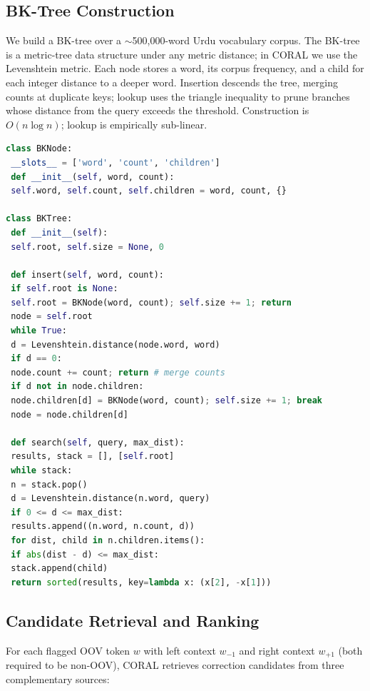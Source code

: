 \subsection{BK-Tree Construction}
\label{ssec:bk-construction}

We build a BK-tree over a $\sim$500{,}000-word Urdu vocabulary corpus. The BK-tree is a metric-tree data structure under any metric distance; in CORAL we use the Levenshtein metric. Each node stores a word, its corpus frequency, and a child for each integer distance to a deeper word. Insertion descends the tree, merging counts at duplicate keys; lookup uses the triangle inequality to prune branches whose distance from the query exceeds the threshold. Construction is $O(n \log n)$; lookup is empirically sub-linear.

\begin{lstlisting}[language=Python,caption={BK-tree (excerpt from \texttt{bktree.py}).},label={lst:bktree}]
class BKNode:
 __slots__ = ['word', 'count', 'children']
 def __init__(self, word, count):
 self.word, self.count, self.children = word, count, {}

class BKTree:
 def __init__(self):
 self.root, self.size = None, 0

 def insert(self, word, count):
 if self.root is None:
 self.root = BKNode(word, count); self.size += 1; return
 node = self.root
 while True:
 d = Levenshtein.distance(node.word, word)
 if d == 0:
 node.count += count; return # merge counts
 if d not in node.children:
 node.children[d] = BKNode(word, count); self.size += 1; break
 node = node.children[d]

 def search(self, query, max_dist):
 results, stack = [], [self.root]
 while stack:
 n = stack.pop()
 d = Levenshtein.distance(n.word, query)
 if 0 <= d <= max_dist:
 results.append((n.word, n.count, d))
 for dist, child in n.children.items():
 if abs(dist - d) <= max_dist:
 stack.append(child)
 return sorted(results, key=lambda x: (x[2], -x[1]))
\end{lstlisting}

\subsection{Candidate Retrieval and Ranking}
\label{ssec:oov-ranking}

For each flagged OOV token $w$ with left context $w_{-1}$ and right context $w_{+1}$ (both required to be non-OOV), CORAL retrieves correction candidates from three complementary sources:

